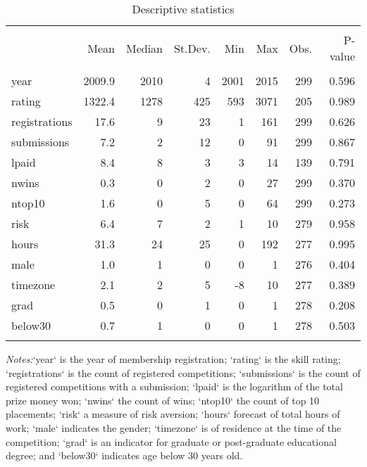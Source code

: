 \documentclass[11pt, titlepage]{article}
\begin{document}
\begin{table}
\centering
\caption{Descriptive statistics}
\label{summary}
\begin{tabular}{@{}lrrrrrrr}
  \\[-1.8ex]\hline\hline\\[-1.8ex]
 & Mean & Median & St.Dev. & Min & Max & Obs. & P-value \\ 
  \hline\\[-1.86ex]
year & 2009.9 & 2010 & 4 & 2001 & 2015 & 299 & 0.596 \\ 
  rating & 1322.4 & 1278 & 425 & 593 & 3071 & 205 & 0.989 \\ 
  registrations & 17.6 & 9 & 23 & 1 & 161 & 299 & 0.626 \\ 
  submissions & 7.2 & 2 & 12 & 0 & 91 & 299 & 0.867 \\ 
  lpaid & 8.4 & 8 & 3 & 3 & 14 & 139 & 0.791 \\ 
  nwins & 0.3 & 0 & 2 & 0 & 27 & 299 & 0.370 \\ 
  ntop10 & 1.6 & 0 & 5 & 0 & 64 & 299 & 0.273 \\ 
  risk & 6.4 & 7 & 2 & 1 & 10 & 279 & 0.958 \\ 
  hours & 31.3 & 24 & 25 & 0 & 192 & 277 & 0.995 \\ 
  male & 1.0 & 1 & 0 & 0 & 1 & 276 & 0.404 \\ 
  timezone & 2.1 & 2 & 5 & -8 & 10 & 277 & 0.389 \\ 
  grad & 0.5 & 0 & 1 & 0 & 1 & 278 & 0.208 \\ 
  below30 & 0.7 & 1 & 0 & 0 & 1 & 278 & 0.503 \\ 
   \hline\\[-1.8ex]
\end{tabular}
\begin{minipage}{\textwidth}
\footnotesize\emph{Notes:}{`year` is the year of membership registration; `rating` is the skill rating; `registrations` is the count of registered competitions; `submissions` is the count of registered competitions with a submission; `lpaid` is the logarithm of the total prize money won; `nwins` the count of wins; `ntop10` the count of top 10 placements; `risk` a measure of risk aversion; `hours` forecast of total hours of work; `male` indicates the gender;  `timezone` is of residence at the time of the competition; `grad` is an indicator for graduate or post-graduate educational degree; and `below30` indicates age below 30 years old.
}\end{minipage}
\end{table}
\end{document}
